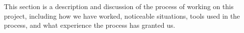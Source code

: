 This section is a description and discussion of the process of working on this project, including how we have worked, noticeable situations, tools used in the process, and what experience the process has granted us.